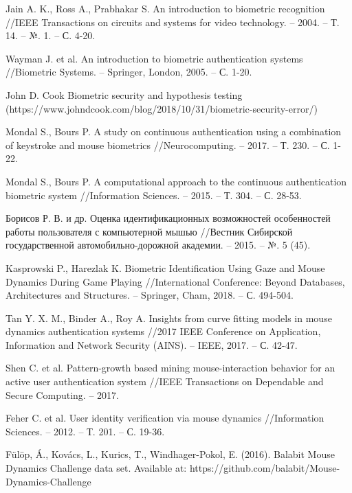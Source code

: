 \documentclass[12pt]{article}
\begin{document}
    \begin{thebibliography}{20}
        Jain A. K., Ross A., Prabhakar S. An introduction to biometric recognition //IEEE Transactions on circuits and systems for video technology. – 2004. – Т. 14. – №. 1. – С. 4-20.
        
        Wayman J. et al. An introduction to biometric authentication systems //Biometric Systems. – Springer, London, 2005. – С. 1-20.

        John D. Cook Biometric security and hypothesis testing (https://www.johndcook.com/blog/2018/10/31/biometric-security-error/)

        Mondal S., Bours P. A study on continuous authentication using a combination of keystroke and mouse biometrics //Neurocomputing. – 2017. – Т. 230. – С. 1-22.

        Mondal S., Bours P. A computational approach to the continuous authentication biometric system //Information Sciences. – 2015. – Т. 304. – С. 28-53.

        Борисов Р. В. и др. Оценка идентификационных возможностей особенностей работы пользователя с компьютерной мышью //Вестник Сибирской государственной автомобильно-дорожной академии. – 2015. – №. 5 (45).

        Kasprowski P., Harezlak K. Biometric Identification Using Gaze and Mouse Dynamics During Game Playing //International Conference: Beyond Databases, Architectures and Structures. – Springer, Cham, 2018. – С. 494-504.

        Tan Y. X. M., Binder A., Roy A. Insights from curve fitting models in mouse dynamics authentication systems //2017 IEEE Conference on Application, Information and Network Security (AINS). – IEEE, 2017. – С. 42-47.

        Shen C. et al. Pattern-growth based mining mouse-interaction behavior for an active user authentication system //IEEE Transactions on Dependable and Secure Computing. – 2017.

        Feher C. et al. User identity verification via mouse dynamics //Information Sciences. – 2012. – Т. 201. – С. 19-36.

        Fülöp, Á., Kovács, L., Kurics, T., Windhager-Pokol, E. (2016). Balabit Mouse Dynamics Challenge data set. Available at: https://github.com/balabit/Mouse-Dynamics-Challenge


\end{thebibliography}
\end{document}

